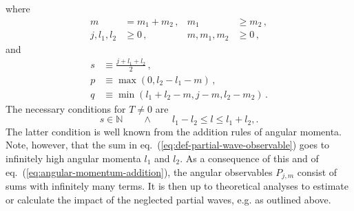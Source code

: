 \documentclass[aps,nofootinbib,preprintnumbers,prd,twocolumn]{revtex4-1}
\newcommand{\refeq}[1]{eq.~(\ref{eq:#1})}
\begin{document}
where
\begin{equation}
\begin{aligned}
    m & = m_1 + m_2\,, &
    m_1 & \geq m_2\,,  \\
    j, l_1, l_2 & \geq 0\,, &
    m, m_1, m_2 & \geq 0\,,
\end{aligned}
\end{equation}
and
\begin{equation}
\begin{aligned}
    s & \equiv \frac{j + l_1 + l_2}{2}\,, \\
    p & \equiv \max(0, l_2 - l_1 - m)\,, \\
    q & \equiv \min(l_1 + l_2 - m, j - m, l_2 - m_2)\,.
\end{aligned}
\end{equation}
The necessary conditions for $T \neq 0$ are
\begin{equation}
    \label{eq:angular-momentum-addition}
    s \in \mathbb{N}\qquad \wedge \qquad l_1 - l_2 \leq l \leq l_1 + l_2,.
\end{equation}
The latter condition is well known from the addition rules of angular momenta. Note, however, that
the sum in \refeq{def-partial-wave-observable} goes to infinitely high angular momenta $l_1$ and $l_2$. As a consequence
of this and of \refeq{angular-momentum-addition}, the angular observables $P_{j,m}$
consist of sums with infinitely many terms. It is then up to theoretical analyses to
estimate or calculate the impact of the neglected partial waves, e.g. as outlined above.



\end{document}
